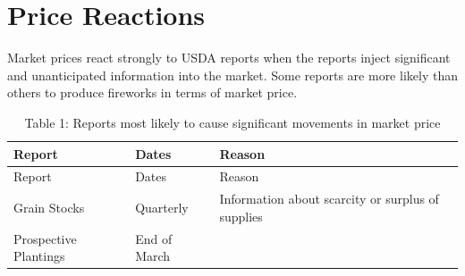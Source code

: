 \documentclass[]{book}
\theoremstyle{definition}
\theoremstyle{definition}
\theoremstyle{remark}
\begin{document}
\section{Price Reactions}\label{price-reactions}

Market prices react strongly to USDA reports when the reports inject
significant and unanticipated information into the market. Some reports
are more likely than others to produce fireworks in terms of market
price.

\begin{longtable}[]{@{}lll@{}}
\caption{Table 1: Reports most likely to cause significant movements in
market price}\tabularnewline
\toprule
\begin{minipage}[b]{0.11\columnwidth}\raggedright\strut
Report\strut
\end{minipage} & \begin{minipage}[b]{0.10\columnwidth}\raggedright\strut
Dates\strut
\end{minipage} & \begin{minipage}[b]{0.11\columnwidth}\raggedright\strut
Reason\strut
\end{minipage}\tabularnewline
\midrule
\endfirsthead
\toprule
\begin{minipage}[b]{0.11\columnwidth}\raggedright\strut
Report\strut
\end{minipage} & \begin{minipage}[b]{0.10\columnwidth}\raggedright\strut
Dates\strut
\end{minipage} & \begin{minipage}[b]{0.11\columnwidth}\raggedright\strut
Reason\strut
\end{minipage}\tabularnewline
\midrule
\endhead
\begin{minipage}[t]{0.11\columnwidth}\raggedright\strut
Grain Stocks\strut
\end{minipage} & \begin{minipage}[t]{0.10\columnwidth}\raggedright\strut
Quarterly\strut
\end{minipage} & \begin{minipage}[t]{0.11\columnwidth}\raggedright\strut
Information about scarcity or surplus of supplies\strut
\end{minipage}\tabularnewline
\begin{minipage}[t]{0.11\columnwidth}\raggedright\strut
Prospective Plantings\strut
\end{minipage} & \begin{minipage}[t]{0.10\columnwidth}\raggedright\strut
End of March\strut

\end{minipage}
\end{longtable}
\end{document}
